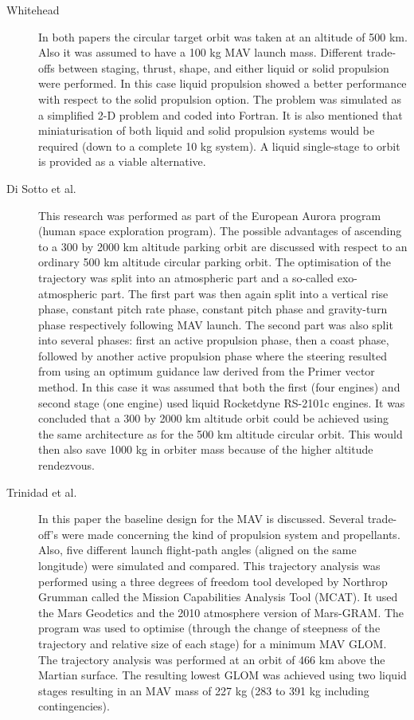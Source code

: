 \begin{description}
\item[Whitehead \cite{whitehead2004mars,whitehead2005}] In both papers the circular target orbit was taken at an altitude of 500 km. Also it was assumed to have a 100 kg \ac{MAV} launch mass. Different trade-offs between staging, thrust, shape, and either liquid or solid propulsion were performed. In this case liquid propulsion showed a better performance with respect to the solid propulsion option. The problem was simulated as a simplified 2-D problem and coded into Fortran. It is also mentioned that miniaturisation of both liquid and solid propulsion systems would be required (down to a complete 10 kg system). A liquid single-stage to orbit is provided as a viable alternative.    
\item[Di Sotto et al. \cite{di2007system}]This research was performed as part of the European Aurora program (human space exploration program). The possible advantages of ascending to a 300 by 2000 km altitude parking orbit are discussed with respect to an ordinary 500 km altitude circular parking orbit. The optimisation of the trajectory was split into an atmospheric part and a so-called exo-atmospheric part. The first part was then again split into a vertical rise phase, constant pitch rate phase, constant pitch phase and gravity-turn phase respectively following \ac{MAV} launch. The second part was also split into several phases: first an active propulsion phase, then a coast phase, followed by another active propulsion phase where the steering resulted from using an optimum guidance law derived from the Primer vector method. In this case it was assumed that both the first (four engines) and second stage (one engine) used liquid Rocketdyne RS-2101c engines. It was concluded that a 300 by 2000 km altitude orbit could be achieved using the same architecture as for the 500 km altitude circular orbit. This would then also save 1000 kg in orbiter mass because of the higher altitude rendezvous.
\item[Trinidad et al. \cite{trinidad2012}] In this paper the baseline design for the \ac{MAV} is discussed. Several trade-off's were made concerning the kind of propulsion system and propellants. Also, five different launch flight-path angles (aligned on the same longitude) were simulated and compared. This trajectory analysis was performed using a three degrees of freedom tool developed by Northrop Grumman called the Mission Capabilities Analysis Tool (MCAT). It used the Mars Geodetics and the 2010 atmosphere version of Mars-\ac{GRAM}. The program was used to optimise (through the change of steepness of the trajectory and relative size of each stage) for a minimum \ac{MAV} \ac{GLOM}. The trajectory analysis was performed at an orbit of 466 km above the Martian surface. The resulting lowest \ac{GLOM} was achieved using two liquid stages resulting in an \ac{MAV} mass of 227 kg (283 to 391 kg including contingencies). 

\end{description}
